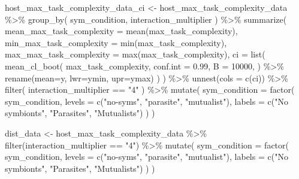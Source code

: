 \documentclass[
]{book}
\newenvironment{Shaded}{\begin{snugshade}}{\end{snugshade}}
\newcommand{\AttributeTok}[1]{\textcolor[rgb]{0.77,0.63,0.00}{#1}}
\newcommand{\DecValTok}[1]{\textcolor[rgb]{0.00,0.00,0.81}{#1}}
\newcommand{\FloatTok}[1]{\textcolor[rgb]{0.00,0.00,0.81}{#1}}
\newcommand{\FunctionTok}[1]{\textcolor[rgb]{0.00,0.00,0.00}{#1}}
\newcommand{\NormalTok}[1]{#1}
\newcommand{\OtherTok}[1]{\textcolor[rgb]{0.56,0.35,0.01}{#1}}
\newcommand{\SpecialCharTok}[1]{\textcolor[rgb]{0.00,0.00,0.00}{#1}}
\newcommand{\StringTok}[1]{\textcolor[rgb]{0.31,0.60,0.02}{#1}}
\begin{document}
\begin{Shaded}
\begin{Highlighting}[]
\NormalTok{host\_max\_task\_complexity\_data\_ci }\OtherTok{\textless{}{-}}\NormalTok{ host\_max\_task\_complexity\_data }\SpecialCharTok{\%\textgreater{}\%}
  \FunctionTok{group\_by}\NormalTok{(}
\NormalTok{    sym\_condition,}
\NormalTok{    interaction\_multiplier}
\NormalTok{  ) }\SpecialCharTok{\%\textgreater{}\%}
  \FunctionTok{summarize}\NormalTok{(}
    \AttributeTok{mean\_max\_task\_complexity =} \FunctionTok{mean}\NormalTok{(max\_task\_complexity),}
    \AttributeTok{min\_max\_task\_complexity =} \FunctionTok{min}\NormalTok{(max\_task\_complexity),}
    \AttributeTok{max\_max\_task\_complexity =} \FunctionTok{max}\NormalTok{(max\_task\_complexity),}
    \AttributeTok{ci =} \FunctionTok{list}\NormalTok{(}
      \FunctionTok{mean\_cl\_boot}\NormalTok{(}
\NormalTok{        max\_task\_complexity,}
        \AttributeTok{conf.int =} \FloatTok{0.99}\NormalTok{,}
        \AttributeTok{B =} \DecValTok{10000}\NormalTok{,}
\NormalTok{      ) }\SpecialCharTok{\%\textgreater{}\%} \FunctionTok{rename}\NormalTok{(}\AttributeTok{mean=}\NormalTok{y, }\AttributeTok{lwr=}\NormalTok{ymin, }\AttributeTok{upr=}\NormalTok{ymax)}
\NormalTok{    )}
\NormalTok{  ) }\SpecialCharTok{\%\textgreater{}\%}
  \FunctionTok{unnest}\NormalTok{(}\AttributeTok{cols =} \FunctionTok{c}\NormalTok{(ci)) }\SpecialCharTok{\%\textgreater{}\%}
  \FunctionTok{filter}\NormalTok{(}
\NormalTok{    interaction\_multiplier }\SpecialCharTok{==} \StringTok{"4"}
\NormalTok{  ) }\SpecialCharTok{\%\textgreater{}\%}
  \FunctionTok{mutate}\NormalTok{(}
    \AttributeTok{sym\_condition =} \FunctionTok{factor}\NormalTok{(}
\NormalTok{      sym\_condition,}
      \AttributeTok{levels =} \FunctionTok{c}\NormalTok{(}\StringTok{"no{-}syms"}\NormalTok{, }\StringTok{"parasite"}\NormalTok{, }\StringTok{"mutualist"}\NormalTok{),}
      \AttributeTok{labels =} \FunctionTok{c}\NormalTok{(}\StringTok{"No symbionts"}\NormalTok{, }\StringTok{"Parasites"}\NormalTok{, }\StringTok{"Mutualists"}\NormalTok{)}
\NormalTok{    )}
\NormalTok{  )}

\NormalTok{dist\_data }\OtherTok{\textless{}{-}}\NormalTok{ host\_max\_task\_complexity\_data }\SpecialCharTok{\%\textgreater{}\%}
  \FunctionTok{filter}\NormalTok{(interaction\_multiplier }\SpecialCharTok{==} \StringTok{"4"}\NormalTok{) }\SpecialCharTok{\%\textgreater{}\%}
  \FunctionTok{mutate}\NormalTok{(}
    \AttributeTok{sym\_condition =} \FunctionTok{factor}\NormalTok{(}
\NormalTok{      sym\_condition,}
      \AttributeTok{levels =} \FunctionTok{c}\NormalTok{(}\StringTok{"no{-}syms"}\NormalTok{, }\StringTok{"parasite"}\NormalTok{, }\StringTok{"mutualist"}\NormalTok{),}
      \AttributeTok{labels =} \FunctionTok{c}\NormalTok{(}\StringTok{"No symbionts"}\NormalTok{, }\StringTok{"Parasites"}\NormalTok{, }\StringTok{"Mutualists"}\NormalTok{)}
\NormalTok{    )}
\NormalTok{  )}


\end{Highlighting}
\end{Shaded}
\end{document}
